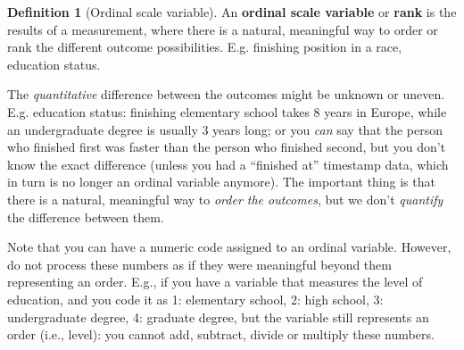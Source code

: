 \documentclass[
  11pt,
]{book}
\theoremstyle{definition}
\newtheorem{definition}{Definition}[chapter]
\theoremstyle{definition}
\theoremstyle{definition}
\theoremstyle{definition}
\theoremstyle{remark}
\begin{document}
\begin{definition}[Ordinal scale variable]
\protect\hypertarget{def:defordinal}{}\label{def:defordinal}An \textbf{ordinal scale variable} or \textbf{rank} is the results of a measurement, where there is a natural, meaningful way to order or rank the different outcome possibilities. E.g. finishing position in a race, education status.
\end{definition}

The \emph{quantitative} difference between the outcomes might be unknown or uneven. E.g. education status: finishing elementary school takes 8 years in Europe, while an undergraduate degree is usually 3 years long; or you \emph{can} say that the person who finished first was faster than the person who finished second, but you don't know the exact difference (unless you had a ``finished at'' timestamp data, which in turn is no longer an ordinal variable anymore). The important thing is that there is a natural, meaningful way to \emph{order the outcomes}, but we don't \emph{quantify} the difference between them.

Note that you can have a numeric code assigned to an ordinal variable. However, do not process these numbers as if they were meaningful beyond them representing an order. E.g., if you have a variable that measures the level of education, and you code it as 1: elementary school, 2: high school, 3: undergraduate degree, 4: graduate degree, but the variable still represents an order (i.e., level): you cannot add, subtract, divide or multiply these numbers.
\end{document}

